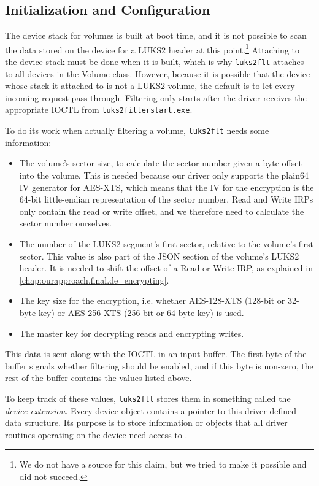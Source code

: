 \subsection{Initialization and Configuration}
\label{chap:ourapproach.final.init}
The device stack for volumes is built at boot time, and it is not possible to scan the data stored on the device for a LUKS2 header at this point.\footnote{\label{fn:ourapproach.final.readatboot} We do not have a source for this claim, but we tried to make it possible and did not succeed.} Attaching to the device stack must be done when it is built, which is why \texttt{luks2flt} attaches to all devices in the Volume class. However, because it is possible that the device whose stack it attached to is not a LUKS2 volume, the default is to let every incoming request pass through. Filtering only starts after the driver receives the appropriate IOCTL from \texttt{luks2filterstart.exe}.

To do its work when actually filtering a volume, \texttt{luks2flt} needs some information:
\begin{itemize}
	\item The volume's sector size, to calculate the sector number given a byte offset into the volume. This is needed because our driver only supports the plain64 IV generator for AES-XTS, which means that the IV for the encryption is the 64-bit little-endian representation of the sector number. Read and Write IRPs only contain the read or write offset, and we therefore need to calculate the sector number ourselves.
	\item The number of the LUKS2 segment's first sector, relative to the volume's first sector. This value is also part of the JSON section of the volume's LUKS2 header. It is needed to shift the offset of a Read or Write IRP, as explained in \autoref{chap:ourapproach.final.de_encrypting}.
	\item The key size for the encryption, i.e. whether AES-128-XTS (128-bit or 32-byte key) or AES-256-XTS (256-bit or 64-byte key) is used.
	\item The master key for decrypting reads and encrypting writes.
\end{itemize}
This data is sent along with the IOCTL in an input buffer. The first byte of the buffer signals whether filtering should be enabled, and if this byte is non-zero, the rest of the buffer contains the values listed above.

To keep track of these values, \texttt{luks2flt} stores them in something called the \emph{device extension}. Every device object contains a pointer to this driver-defined data structure. Its purpose is to store information or objects that all driver routines operating on the device need access to \cite{Kerneldriver}.


